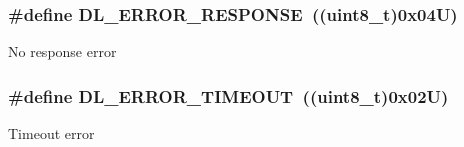 \subsubsection[{\texorpdfstring{D\+L\+\_\+\+E\+R\+R\+O\+R\+\_\+\+R\+E\+S\+P\+O\+N\+SE}{DL_ERROR_RESPONSE}}]{\setlength{\rightskip}{0pt plus 5cm}\#define D\+L\+\_\+\+E\+R\+R\+O\+R\+\_\+\+R\+E\+S\+P\+O\+N\+SE~((uint8\+\_\+t)0x04\+U)}\hypertarget{group___d_l___error___code_ga8e9c3a3595a98bbc1d3a46262a93303b}{}\label{group___d_l___error___code_ga8e9c3a3595a98bbc1d3a46262a93303b}
No response error 
\subsubsection[{\texorpdfstring{D\+L\+\_\+\+E\+R\+R\+O\+R\+\_\+\+T\+I\+M\+E\+O\+UT}{DL_ERROR_TIMEOUT}}]{\setlength{\rightskip}{0pt plus 5cm}\#define D\+L\+\_\+\+E\+R\+R\+O\+R\+\_\+\+T\+I\+M\+E\+O\+UT~((uint8\+\_\+t)0x02\+U)}\hypertarget{group___d_l___error___code_gaa75de5faaf914c3a1217429c157c8be7}{}\label{group___d_l___error___code_gaa75de5faaf914c3a1217429c157c8be7}
Timeout error 